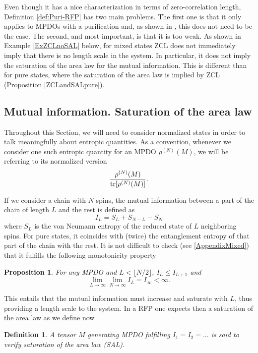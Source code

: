 \documentclass{elsarticle}
\newcommand{\be}{\begin{equation}}
\newcommand{\ee}{\end{equation}}
\newtheorem{prop}[thm]{Proposition}
\newtheorem{defn}[thm]{Definition}
\begin{document}
Even though it has a nice characterization in terms of zero-correlation length, Definition \ref{def:Puri-RFP} has two main problems. The first one is that it only applies to MPDOs with a purification and, as shown in \cite{Gemma}, this does not need to be the case. The second, and most important, is that it is too weak. As shown in Example \ref{ExZCLnoSAL} below, for mixed states ZCL does not immediately imply that there is no length scale in the system. In particular, it does not imply the saturation of the area law for the mutual information. This is different than for pure states, where the saturation of the area law is implied by ZCL (Proposition \ref{ZCLandSALpure}).

\subsection{Mutual information. Saturation of the area law}
\label{MixedMutual}

Throughout this Section, we will need to consider normalized states in order to talk meaningfully about entropic quantities. As a convention, whenever we consider one such entropic quantity for an MPDO $\rho^{(N)}(M)$, we will be referring to its normalized version 
$$\frac{\rho^{(N)}(M)}{{\rm tr}[\rho^{(N)}(M)]}.$$

If we consider a chain with $N$ spins, the mutual information between a part of the chain of length $L$ and the rest is defined as
 \be
 I_L = S_L + S_{N-L}- S_N
 \ee
where $S_L$ is the von Neumann entropy of the reduced state of $L$ neighboring spins. For pure states, it coincides with (twice) the entanglement entropy of that part of the chain with the rest. It is not difficult to check (see \ref{AppendixMixed}) that it fulfills the following monotonicity property

\begin{prop}
\label{PropILILp1}
For any MPDO and $L<\lfloor N/2\rfloor$, $I_{L}\le I_{L+1}$ and
 \be
 \lim_{L\to\infty} \lim_{N\to\infty} I_L =I_\infty <\infty.
 \ee
\end{prop}

This entails that the mutual information must increase and saturate with $L$, thus providing a length scale to the system. In a RFP one expects then a saturation of the area law as we define now

\begin{defn}\label{def:area-law}
A tensor $M$ generating MPDO fulfilling $I_1=I_2=...$ is said to verify {\em saturation of the area law} (SAL).
\end{defn}
\end{document}
